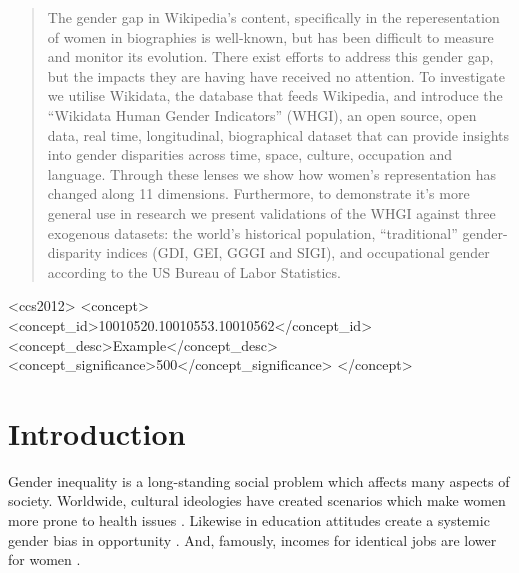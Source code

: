 \documentclass{sig-alternate-05-2015}
\begin{document}
\maketitle
\begin{abstract}
The gender gap in Wikipedia's content, specifically in the reperesentation of women in biographies is well-known, but has been difficult to measure and monitor its evolution. There exist efforts to address this gender gap, but the impacts they are having have received no attention. To investigate we utilise Wikidata, the database that feeds Wikipedia, and introduce the ``Wikidata Human Gender Indicators'' (WHGI), an open source, open data, real time, longitudinal, biographical dataset that can provide insights into gender disparities across time, space, culture, occupation and language. Through these lenses we show how women's representation has changed along 11 dimensions. Furthermore, to demonstrate it's more general use in research we present validations of the WHGI against three exogenous datasets: the world's historical population, ``traditional'' gender-disparity indices (GDI, GEI, GGGI and SIGI), and occupational gender according to the US Bureau of Labor Statistics.
\end{abstract}


%
%
\begin{CCSXML}
<ccs2012>
 <concept>
  <concept_id>10010520.10010553.10010562</concept_id>
  <concept_desc>Example</concept_desc>
  <concept_significance>500</concept_significance>
 </concept>

\end{CCSXML}



%
%

%
%
\printccsdesc



\section{Introduction}

Gender inequality is a long-standing social problem which affects many aspects of society. Worldwide, cultural ideologies have created scenarios which make women more prone to health issues \cite{world_health_organization_women_2009}. Likewise in education attitudes create a systemic gender bias in opportunity \cite{heward_gender_1999}. And, famously, incomes for identical jobs are lower for women \cite{burstein_equal_????}.
\end{document}
